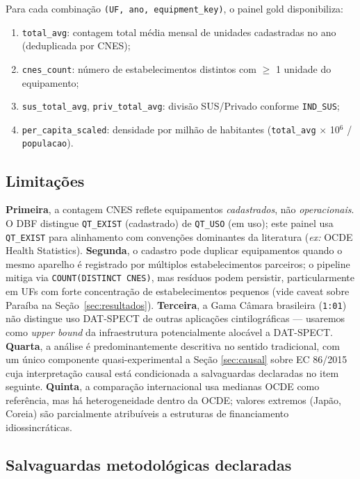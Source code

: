 \documentclass[12pt,a4paper,oneside]{article}
\begin{document}
Para cada combinação \texttt{(UF, ano, equipment\_key)}, o painel
gold disponibiliza:

\begin{enumerate}
\item \texttt{total\_avg}: contagem total média mensal de unidades
cadastradas no ano (deduplicada por CNES);
\item \texttt{cnes\_count}: número de estabelecimentos distintos com
$\geq$ 1 unidade do equipamento;
\item \texttt{sus\_total\_avg}, \texttt{priv\_total\_avg}: divisão
SUS/Privado conforme \texttt{IND\_SUS};
\item \texttt{per\_capita\_scaled}: densidade por milhão de
habitantes (\texttt{total\_avg} $\times$ 10$^{6}$ / \texttt{populacao}).
\end{enumerate}

\subsection{Limitações}

\textbf{Primeira}, a contagem CNES reflete equipamentos
\textit{cadastrados}, não \textit{operacionais}. O DBF distingue
\texttt{QT\_EXIST} (cadastrado) de \texttt{QT\_USO} (em uso); este
painel usa \texttt{QT\_EXIST} para alinhamento com convenções
dominantes da literatura (\textit{ex:} OCDE Health Statistics).
\textbf{Segunda}, o cadastro pode duplicar equipamentos quando o
mesmo aparelho é registrado por múltiplos estabelecimentos parceiros;
o pipeline mitiga via \texttt{COUNT(DISTINCT CNES)}, mas resíduos
podem persistir, particularmente em UFs com forte concentração de
estabelecimentos pequenos (vide caveat sobre Paraíba na
Seção~\ref{sec:resultados}). \textbf{Terceira}, a Gama Câmara
brasileira (\texttt{1:01}) não distingue uso DAT-SPECT de outras
aplicações cintilográficas — usaremos como \textit{upper bound} da
infraestrutura potencialmente alocável a DAT-SPECT. \textbf{Quarta}, a
análise é predominantemente descritiva no sentido tradicional, com
um único componente quasi-experimental \textemdash{} a Seção
\ref{sec:causal} sobre EC 86/2015 \textemdash{} cuja interpretação
causal está condicionada a salvaguardas declaradas no item seguinte.
\textbf{Quinta}, a comparação internacional usa medianas OCDE como
referência, mas há heterogeneidade dentro da OCDE; valores extremos
(Japão, Coreia) são parcialmente atribuíveis a estruturas de
financiamento idiossincráticas.

\subsection{Salvaguardas metodológicas declaradas}\label{subsec:salvaguardas}
\end{document}
